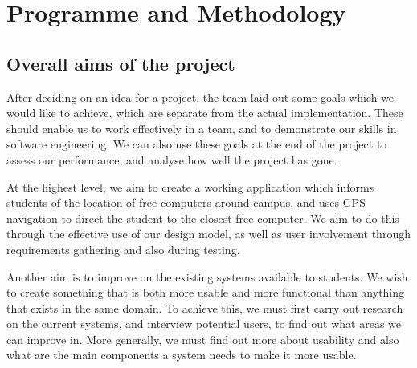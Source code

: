 \documentclass[10pt,a4paper,oneside]{report}
\begin{document}
\clearpage
\section*{Programme and Methodology}
\subsection*{Overall aims of the project}
After deciding on an idea for a project, the team laid out some goals which we would like to achieve, which are separate from the actual implementation. These should enable us to work effectively in a team, and to demonstrate our skills in software engineering. We can also use these goals at the end of the project to assess our performance, and analyse how well the project has gone.

At the highest level, we aim to create a working application which informs students of the location of free computers around campus, and uses GPS navigation to direct the student to the closest free computer. We aim to do this through the effective use of our design model, as well as user involvement through requirements gathering and also during testing.

Another aim is to improve on the existing systems available to students. We wish to create something that is both more usable and more functional than anything that exists in the same domain. To achieve this, we must first carry out research on the current systems, and interview potential users, to find out what areas we can improve in. More generally, we must find out more about usability and also what are the main components a system needs to make it more usable.
\end{document}
